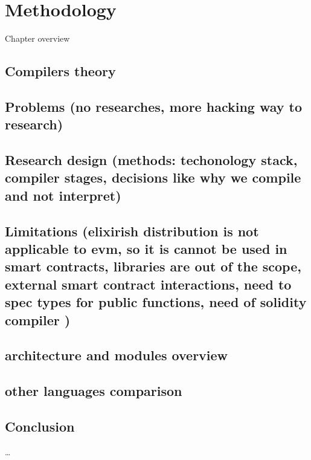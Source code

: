 \chapter{Methodology}
\label{chap:met}

Chapter overview

\section{Compilers theory}
\label{}

\section{Problems (no researches, more hacking way to research)}
\label{}

\section{Research design (methods: techonology stack, compiler stages, decisions like why we compile and not interpret)}
\label{}

\section{Limitations (elixirish distribution is not applicable to evm, so it is cannot be used in smart contracts, libraries are out of the scope, external smart contract interactions, need to spec types for public functions, need of solidity compiler )}
\label{}

\section{architecture and modules overview}
\label{}

\section{other languages comparison}
\label{}

\section{Conclusion}



\ldots

